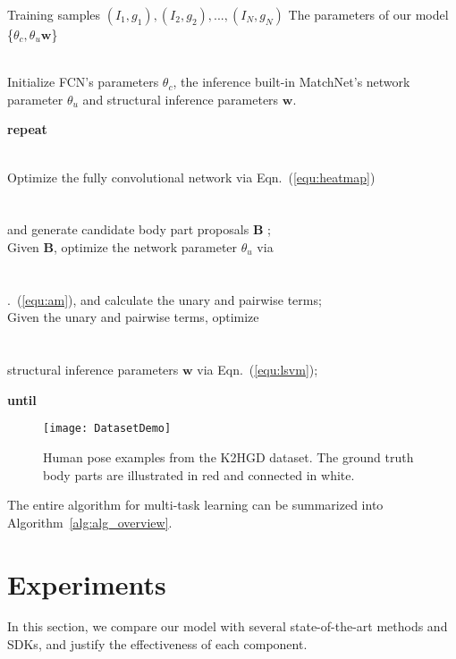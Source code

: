 \documentclass{sig-alternate-05-2015}
\newcommand{\INPUT}{\item[\myinput]}
\newcommand{\myinput}{\textbf{Initialization:}}
\newcommand{\mywhile}{\textbf{repeat}}
\newcommand{\myendwhile}{\textbf{until}}
\begin{document}
\begin{algorithm}[t]
\caption{}
\label{alg:alg_overview}
\begin{algorithmic}[1]
\REQUIRE Training samples $(I_1, g_1), (I_2, g_2), ..., (I_N, g_N)$
\ENSURE The parameters of our model \{$\theta_c, \theta_u \mathbf{w}$\}
\INPUT ~~\\
	 Initialize FCN's parameters $\theta_c$, the inference built-in MatchNet's network parameter $\theta_u$ and structural inference parameters $\mathbf{w}$.
	 
\mywhile	 

\STATE \\Optimize the fully convolutional network via Eqn.~(\ref{equ:heatmap})  \\	 
\\\\and generate candidate body part proposals $\textbf{B}$ ;
\STATE \\Given $\textbf{B}$, optimize the network parameter $\theta_u$ via \\
\\\\\Eqn.~(\ref{equ:am}), and calculate the unary and pairwise terms;
\STATE \\Given the unary and pairwise terms, optimize \\ 
\\\\structural inference parameters $\mathbf{w}$ via Eqn.~(\ref{equ:lsvm});

\myendwhile {}
\end{algorithmic}
\end{algorithm}

\begin{figure}[t]
\centering
\texttt{[image: DatasetDemo]}
\caption{Human pose examples from the K2HGD dataset. The ground truth body parts are illustrated in red and connected in white.}\label{fig:dataset}
\end{figure} 

The entire algorithm for multi-task learning can be summarized into Algorithm~\ref{alg:alg_overview}. 

\section{Experiments}
\label{sec:exper}
In this section, we compare our model with several state-of-the-art methods and SDKs, and justify the effectiveness of each component.
\end{document}
